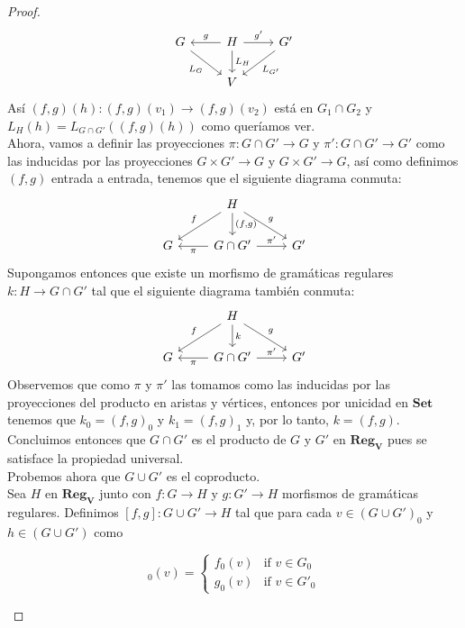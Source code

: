 \documentclass[../main.tex]{subfiles}
\begin{document}
\begin{proof}
 	\[
 	\begin{tikzcd}
 		G \arrow[swap]{rd}{L_G} & H \arrow{r}{g'} \arrow[swap]{l}{g} \arrow{d}{L_H}  & G' \arrow{ld}{L_{G'}} \\
 		& V 
 	\end{tikzcd}
 	\]
 	Así $(f,g)(h):(f,g)(v_1) \to (f,g)(v_2)$ está en $G_1 \cap G_2$ y $L_H(h)=L_{G\cap G'}((f,g)(h))$ como queríamos ver. \\
 	Ahora, vamos a definir las proyecciones $\pi : G\cap G' \to G$ y $\pi' : G\cap G' \to G'$ como las inducidas por las proyecciones $G \times G' \to G$ y $G \times G' \to G$, así como definimos $(f,g)$ entrada a entrada, tenemos que el siguiente diagrama conmuta: 
 	 \[
 	\begin{tikzcd} 		
 		& H \arrow{d}{(f,g)} \arrow[swap]{ld}{f} \arrow{rd}{g} & \\
 		G  & G\cap G' \arrow{l}{\pi} \arrow{r}{\pi'} & G'
 	\end{tikzcd}
 	\]
 	Supongamos entonces que existe un morfismo de gramáticas regulares $k: H \to G\cap G'$ tal que el siguiente diagrama también conmuta: 
 	 \[
	\begin{tikzcd} 		
		& H \arrow{d}{k} \arrow[swap]{ld}{f} \arrow{rd}{g} & \\
		G  & G\cap G' \arrow{l}{\pi} \arrow{r}{\pi'} & G'
	\end{tikzcd}
	\]
	Observemos que como $\pi$ y $\pi'$ las tomamos como las inducidas por las proyecciones del producto en aristas y vértices, entonces por unicidad en $\mathbf{Set}$ tenemos que $k_0=(f,g)_0$ y $k_1=(f,g)_1$ y, por lo tanto, $k=(f,g)$. \\
	Concluimos entonces que $G \cap G'$ es el producto de $G$ y $G'$ en $\mathbf{Reg_V}$ pues se satisface la propiedad universal. \\
	Probemos ahora que $G\cup G'$ es el coproducto. \\
	Sea $H$ en $\mathbf{Reg_V}$ junto con $f:G \to H$ y $g:G' \to H$ morfismos de gramáticas regulares. Definimos $[f,g]:G\cup G' \to H$ tal que para cada $v \in (G\cup G')_0$ y $h \in (G\cup G')$ como
	\begin{multicols}{2}
		\begin{equation*}
			[f,g]_0(v)=
			\begin{cases}
				f_0(v) & \text{if } v \in G_0\\
				g_0(v) & \text{if } v \in G'_0
			\end{cases}
		\end{equation*}
        

\end{multicols}
\end{proof}
\end{document}
